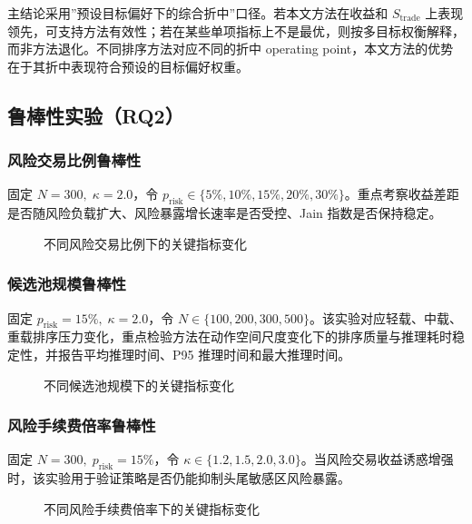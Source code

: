 主结论采用”预设目标偏好下的综合折中”口径。若本文方法在收益和 $S_{\text{trade}}$ 上表现领先，可支持方法有效性；若在某些单项指标上不是最优，则按多目标权衡解释，而非方法退化。不同排序方法对应不同的折中 operating point，本文方法的优势在于其折中表现符合预设的目标偏好权重。

\subsection{鲁棒性实验（RQ2）}

\subsubsection{风险交易比例鲁棒性}

固定 $N{=}300,\;\kappa{=}2.0$，令 $p_{\text{risk}} \in \{5\%,10\%,15\%,20\%,30\%\}$。重点考察收益差距是否随风险负载扩大、风险暴露增长速率是否受控、Jain 指数是否保持稳定。

\begin{figure}[htbp]
\centering
\caption{不同风险交易比例下的关键指标变化}
\label{fig:robust_risk_ratio}
\end{figure}

\subsubsection{候选池规模鲁棒性}

固定 $p_{\text{risk}}{=}15\%,\;\kappa{=}2.0$，令 $N \in \{100,200,300,500\}$。该实验对应轻载、中载、重载排序压力变化，重点检验方法在动作空间尺度变化下的排序质量与推理耗时稳定性，并报告平均推理时间、P95 推理时间和最大推理时间。

\begin{figure}[htbp]
\centering
\caption{不同候选池规模下的关键指标变化}
\label{fig:robust_pool_size}
\end{figure}

\subsubsection{风险手续费倍率鲁棒性}

固定 $N{=}300,\;p_{\text{risk}}{=}15\%$，令 $\kappa \in \{1.2,1.5,2.0,3.0\}$。当风险交易收益诱惑增强时，该实验用于验证策略是否仍能抑制头尾敏感区风险暴露。

\begin{figure}[htbp]
\centering
\caption{不同风险手续费倍率下的关键指标变化}
\label{fig:robust_fee_multiplier}
\end{figure}

